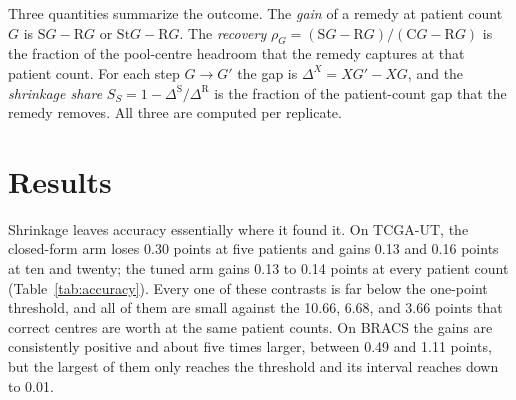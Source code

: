 \documentclass[11pt]{article}
\begin{document}
Three quantities summarize the outcome. The \emph{gain} of a remedy at patient count $G$ is $\mathrm S G-\mathrm R G$ or $\mathrm{St}G-\mathrm R G$. The \emph{recovery} $\rho_G=(\mathrm S G-\mathrm R G)/(\mathrm C G-\mathrm R G)$ is the fraction of the pool-centre headroom that the remedy captures at that patient count. For each step $G\to G'$ the gap is $\Delta^X=XG'-XG$, and the \emph{shrinkage share} $S_S=1-\Delta^{\mathrm S}/\Delta^{\mathrm R}$ is the fraction of the patient-count gap that the remedy removes. All three are computed per replicate.

\section{Results}
\label{sec:results}
Shrinkage leaves accuracy essentially where it found it. On TCGA-UT, the closed-form arm loses 0.30 points at five patients and gains 0.13 and 0.16 points at ten and twenty; the tuned arm gains 0.13 to 0.14 points at every patient count (Table~\ref{tab:accuracy}). Every one of these contrasts is far below the one-point threshold, and all of them are small against the 10.66, 6.68, and 3.66 points that correct centres are worth at the same patient counts. On BRACS the gains are consistently positive and about five times larger, between 0.49 and 1.11 points, but the largest of them only reaches the threshold and its interval reaches down to 0.01.
\end{document}
